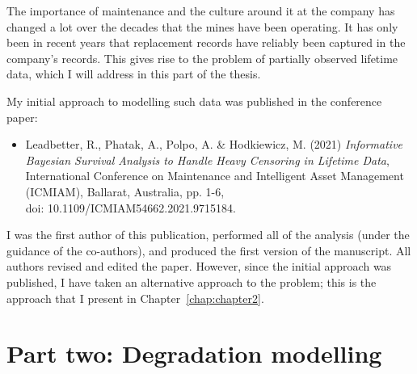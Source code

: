 \documentclass[apa,colorlinks,emptypage]{curtinThesis}
\begin{document}
The importance of maintenance and the culture around it at the company has changed a lot over the decades that the mines have been operating. It has only been in recent years that replacement records have reliably been captured in the company's records. This gives rise to the problem of partially observed lifetime data, which I will address in this part of the thesis.

My initial approach to modelling such data was published in the conference paper:
\begin{itemize}
  \item Leadbetter, R., Phatak, A., Polpo, A. \& Hodkiewicz, M. (2021) \textit{Informative Bayesian Survival Analysis to Handle Heavy Censoring in Lifetime Data}, International Conference on Maintenance and Intelligent Asset Management (ICMIAM), Ballarat, Australia, pp. 1-6,\\ doi: 10.1109/ICMIAM54662.2021.9715184.
\end{itemize}
I was the first author of this publication, performed all of the analysis (under the guidance of the co-authors), and produced the first version of the manuscript. All authors revised and edited the paper. However, since the initial approach was published, I have taken an alternative approach to the problem; this is the approach that I present in Chapter~\ref{chap:chapter2}.




\part{Part two: Degradation modelling}\label{part:two}
\end{document}

